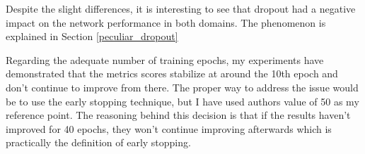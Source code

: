 Despite the slight differences, it is interesting to see that dropout had a
negative impact on the network performance in both domains. The phenomenon is 
explained in Section \ref{peculiar_dropout}

Regarding the adequate number of training epochs, my experiments have
demonstrated that the metrics scores stabilize at around the 10th epoch and
don't continue to improve from there. The proper way to address the issue would
be to use the early stopping technique\cite{early_stop}, but I have used
authors value of 50 as my reference point. The reasoning behind this decision
is that if the results haven't improved for 40 epochs, they won't continue
improving afterwards which is practically the definition of early stopping.

